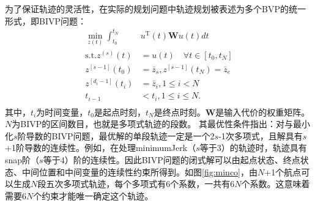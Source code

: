 \documentclass[master,academic]{ysuthesis} %
\begin{document}
		为了保证轨迹的灵活性，在实际的规划问题中轨迹规划被表述为多个BVP的统一形式，即BIVP问题：
		\begin{equation}
			\begin{aligned}
				\min_{z(t)}\int_{t_0}^{t_N}&u^{\mathrm{T}}(t)\bm{W}u(t)dt\\
				\text{s.t}.z^{( s )}(t) &=u(t) \quad \forall t\in \left[ t_0,t_N \right]\\
				z^{\left[ s-1 \right]}( t_0 ) &=\bar{z}_s,z^{\left[ s-1 \right]}( t_N ) =\bar{z}_e\\
				z^{\left[ d_i-1 \right]}( t_i ) &=\bar{z}_i,1\leq i<N\\
				t_{i-1}&<t_i,1\leq i\leq N.\\
			\end{aligned}
		\end{equation}
		其中，$t_i$为时间变量，$t_0$是起点时刻，$t_N$是终点时刻。$\bm{W}$是输入代价的权重矩阵。$N$为BIVP的区间数目，也就是多项式轨迹的段数。
		其最优性条件指出：对与最小化$s$阶导数的BIVP问题，最优解的单段轨迹一定是一个2$s$-1次多项式，且解具有$s$+1阶导数的连续性。例如，在处理minimumJerk（$s$等于3）的轨迹时，轨迹具有snap阶（$s$等于4）阶的连续性。因此BIVP问题的闭式解可以由起点状态、终点状态、中间位置和中间变量的连续性约束所得到。如图\ref{fig:minco}，由$N$+1个航点可以生成$N$段五次多项式轨迹，每个多项式有6个系数，一共有6$N$个系数。这意味着需要6$N$个约束才能唯一确定这个轨迹。
	
\end{document}
